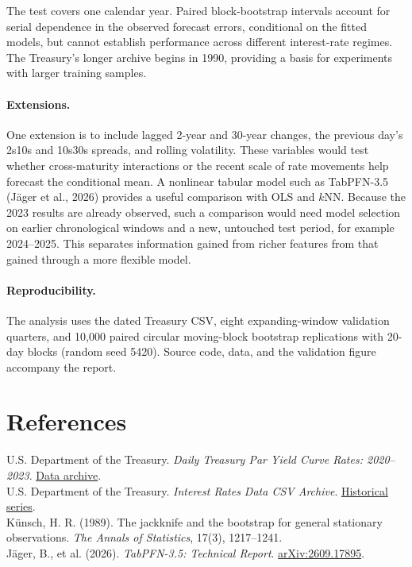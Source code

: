 \documentclass[10pt,letterpaper]{article}
\begin{document}
The test covers one calendar year. Paired block-bootstrap intervals account for serial dependence in the observed forecast errors, conditional on the fitted models, but cannot establish performance across different interest-rate regimes. The Treasury's longer archive begins in 1990, providing a basis for experiments with larger training samples.

\paragraph{Extensions.}
One extension is to include lagged 2-year and 30-year changes, the previous day's 2s10s and 10s30s spreads, and rolling volatility. These variables would test whether cross-maturity interactions or the recent scale of rate movements help forecast the conditional mean. A nonlinear tabular model such as TabPFN-3.5 (J\"ager et al., 2026) provides a useful comparison with OLS and $k$NN. Because the 2023 results are already observed, such a comparison would need model selection on earlier chronological windows and a new, untouched test period, for example 2024--2025. This separates information gained from richer features from that gained through a more flexible model.

\paragraph{Reproducibility.}
The analysis uses the dated Treasury CSV, eight expanding-window validation quarters, and 10,000 paired circular moving-block bootstrap replications with 20-day blocks (random seed 5420). Source code, data, and the validation figure accompany the report.

\section*{References}
\noindent U.S. Department of the Treasury. \emph{Daily Treasury Par Yield Curve Rates: 2020--2023}. \href{https://home.treasury.gov/resource-center/data-chart-center/interest-rates/daily-treasury-rate-archives/par-yield-curve-rates-2020-2023.csv}{Data archive}.\\
\noindent U.S. Department of the Treasury. \emph{Interest Rates Data CSV Archive}. \href{https://home.treasury.gov/interest-rates-data-csv-archive/}{Historical series}.\\
\noindent K\"unsch, H. R. (1989). The jackknife and the bootstrap for general stationary observations. \emph{The Annals of Statistics}, 17(3), 1217--1241.\\
\noindent J\"ager, B., et al. (2026). \emph{TabPFN-3.5: Technical Report}. \href{https://arxiv.org/abs/2609.17895}{arXiv:2609.17895}.
\end{document}
